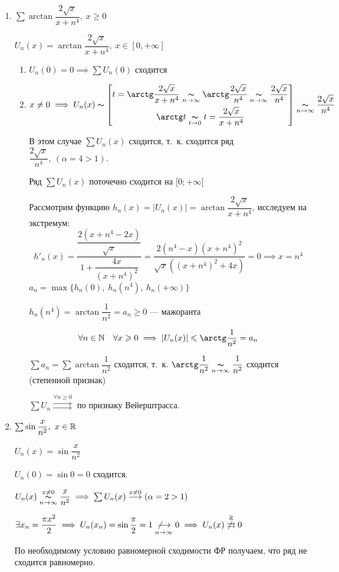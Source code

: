 \documentclass[../../main.tex]{subfiles}
\begin{document}
\begin{exmps}
	\;
	
\begin{enumerate}
\item $\sum \arctan\dfrac{2\sqrt{x}}{x+n^4},\ x \geq 0$

$U_n(x) = \arctan\dfrac{2\sqrt{x}}{x+n^4},\ x \in [0,+\infty]$
	\begin{enumerate}
		\item $U_n(0) = 0 \implies \sum U_n(0)$ сходится
		\item $x \neq 0 \implies U_n(x) \thicksim 
	\left[ \begin{gathered}
	t = \arctan\dfrac{2\sqrt{x}}{x+n^4} \underset{n \to \infty}{\thicksim} 
	\arctan\dfrac{2\sqrt{x}}{n^4} \underset{n \to \infty}{\thicksim}
	\dfrac{2\sqrt{x}}{n^4} \\
	\arctan t \underset{t \to 0}{\thicksim}
	t = \dfrac{2\sqrt{x}}{x+n^4}
	\end{gathered} \right] \underset{n \to \infty}{\thicksim}
	\dfrac{2\sqrt{x}}{n^4}$
	
	В этом случае $\sum U_n(x)$ сходится, т.~к. сходится ряд 
	$\dfrac{2\sqrt{x}}{n^4},\ (\alpha = 4 > 1)$.
	
	Ряд $\sum U_n(x)$ поточечно сходится на $[0;+\infty[$
	
	Рассмотрим функцию $h_n(x) = |U_n(x)| = \arctan\dfrac{2\sqrt{x}}{x+n^4}$, 
	исследуем на экстремум: \\
	\[
	h'_n(x) = \dfrac{\dfrac{2(x + n^4 - 2x)}{\sqrt{x}}}
	{1 + \dfrac{4x}{(x+n^4)^2}} = \dfrac{2(n^4-x)(x+n^4)^2}
	{\sqrt{x}((x+n^4)^2+4x)} = 0 \implies x = n^4
	\]
	$a_n = \max\{ h_n(0),\ h_n(n^4),\ h_n(+\infty) \}$
	
	$ h_n(n^4) = \arctan\dfrac{1}{n^2} = a_n \geq 0$ --- мажоранта
	
	\[
	\forall n \in \N \quad \forall x \geq 0 \implies |U_n(x)| \leq 
	\arctan\dfrac{1}{n^2} = a_n
	\]
	
	$\sum a_n = \sum \arctan\dfrac{1}{n^2}$ сходится, т.~к. 
	$\arctan\dfrac{1}{n^2} \underset{n \to \infty}{\thicksim}
	\dfrac{1}{n^2}$ сходится (степенной признак)
	
	$\sum U_n \overset{\forall n \geq 0}{\rightrightarrows}$ 
	по признаку Вейерштрасса.
	\end{enumerate}	

	\item $\sum \sin\dfrac{x}{n^2},\ x \in \mathbb{R}$ 	 
	
	$U_n(x) = \sin\dfrac{x}{n^2}$
	
	$U_n(0) = \sin0 = 0$ сходится.
	
	$U_n(x) \overset{x \neq 0}{\underset{n \to \infty}\thicksim} 
	\dfrac{x}{n^2} \implies \sum U_n(x) \overset{x \neq 0}{\longrightarrow}
	(\alpha = 2 > 1)$	
	
	$\exists x_n = \dfrac{\pi x^2}{2} \implies U_n(x_n) = 
	\sin\dfrac{\pi}{2} = 1 \underset{n \to \infty}
	{\not \longrightarrow} 0 \implies
	U_n(x) \overset{\mathbb{R}}{\not \rightrightarrows} 0$

	По необходимому условию равномерной сходимости ФР получаем, что ряд 
	не сходится равномерно.
	\end{enumerate}	
\end{exmps}	
\end{document}
